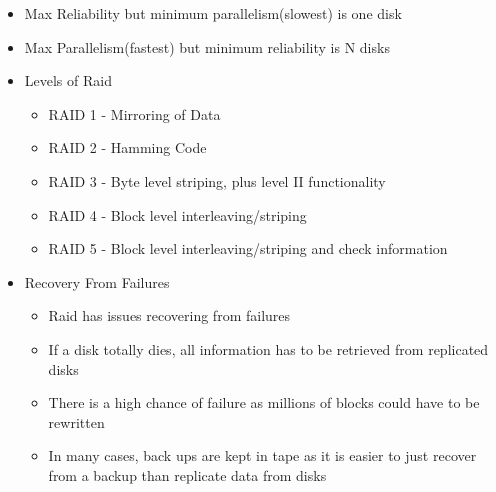 \documentclass[twoside]{article}
\begin{document}
\begin{itemize}
\begin{itemize}
\begin{itemize}
        \end{itemize}
      \end{itemize}
  \item Max Reliability but minimum parallelism(slowest) is one disk
  \item Max Parallelism(fastest) but minimum reliability is N disks
  \item Levels of Raid
  \begin{itemize}
      \item RAID 1 - Mirroring of Data
      \item RAID 2 - Hamming Code
      \item RAID 3 - Byte level striping, plus level II functionality
      \item RAID 4 - Block level interleaving/striping
      \item RAID 5 - Block level interleaving/striping and check information 
  \end{itemize}
\item Recovery From Failures
\begin{itemize}
    \item  Raid has issues recovering from failures
    \item If a disk totally dies, all information has to be retrieved from replicated disks
    \item There is a high chance of failure as millions of blocks could have to be rewritten 
    \item In many cases, back ups are kept in tape as it is easier to just recover from a backup than replicate data from disks
\end{itemize}
\end{itemize}
\end{document}
